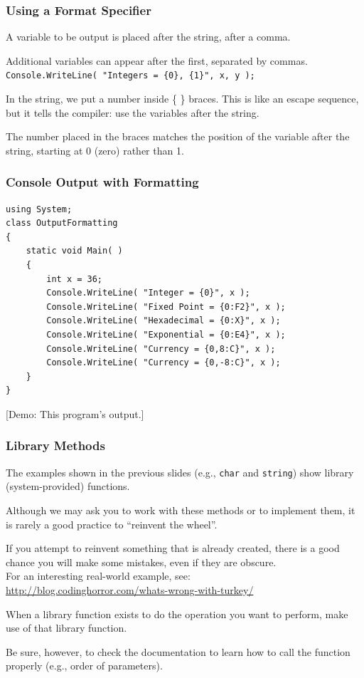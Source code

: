 \begin{frame}
\frametitle{Using a Format Specifier}

A variable to be output is placed after the string, after a comma. 

Additional variables can appear after the first, separated by commas.\\
\quad \texttt{Console.WriteLine( "Integers = \{0\}, \{1\}", x, y );}

In the string, we put a number inside \{ \} braces. This is like an escape sequence, but it tells the compiler: use the variables after the string.

The number placed in the braces matches the position of the variable after the string, starting at 0 (zero) rather than 1.

\end{frame}

\begin{frame}[fragile]
\frametitle{Console Output with Formatting}

\begin{verbatim}
using System;
class OutputFormatting
{
    static void Main( )
    {
        int x = 36;
        Console.WriteLine( "Integer = {0}", x );
        Console.WriteLine( "Fixed Point = {0:F2}", x );
        Console.WriteLine( "Hexadecimal = {0:X}", x );
        Console.WriteLine( "Exponential = {0:E4}", x );
        Console.WriteLine( "Currency = {0,8:C}", x );
        Console.WriteLine( "Currency = {0,-8:C}", x );
    }
}
\end{verbatim}

[Demo: This program's output.]

\end{frame}


\begin{frame}
\frametitle{Library Methods}

The examples shown in the previous slides (e.g., \texttt{char} and \texttt{string}) show library (system-provided) functions.

Although we may ask you to work with these methods or to implement them, it is rarely a good practice to ``reinvent the wheel''.

If you attempt to reinvent something that is already created, there is a good chance you will make some mistakes, even if they are obscure.\\
\quad For an interesting real-world example, see:\\
\quad \url{http://blog.codinghorror.com/whats-wrong-with-turkey/}

When a library function exists to do the operation you want to perform, make use of that library function.

Be sure, however, to check the documentation to learn how to call the function properly (e.g., order of parameters).

\end{frame}




